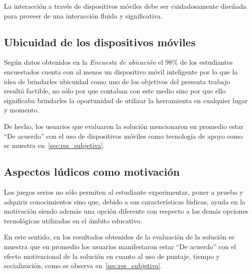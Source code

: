 La interacción a través de dispositivos móviles debe ser cuidadosamente diseñada
para proveer de una interacción fluida y significativa.

\subsection{Ubicuidad de los dispositivos móviles}

Según datos obtenidos en la \emph{Encuesta de ubicación} el $98\%$ de los estudiantes 
encuestados cuenta con al menos un dispositivo móvil inteligente por lo que la idea 
de brindarles ubicuidad como uno de los objetivos del presenta trabajo resultó factible, 
no sólo por que contaban con este medio sino por que ello significaba brindarles la 
oportunidad de utilizar la herramienta en cualquier lugar y momento.

De hecho, los usuarios que evaluaron la solución mencionaron en promedio estar
\enquote{De acuerdo} con el uso de dispositivos móviles como tecnología de apoyo
como se muestra en~\ref{sec:res_subjetiva}.

\subsection{Aspectos lúdicos como motivación}

Los juegos serios no sólo permiten al estudiante experimentar, poner a prueba y
adquirir conocimientos sino que, debido a sus características lúdicas, ayuda en
la motivación siendo además una opción diferente con respecto a las demás
opciones tecnológicas utilizadas en el ámbito educativo.
    
En este sentido, en los resultados obtenidos de la evaluación de la solución se
muestra que en promedio los usuarios manifestaron estar \enquote{De acuerdo} con
el efecto motivacional de la solución en cuanto al uso de puntaje, tiempo y
socialización, como se observa en~\ref{sec:res_subjetiva}.



    
 
 






